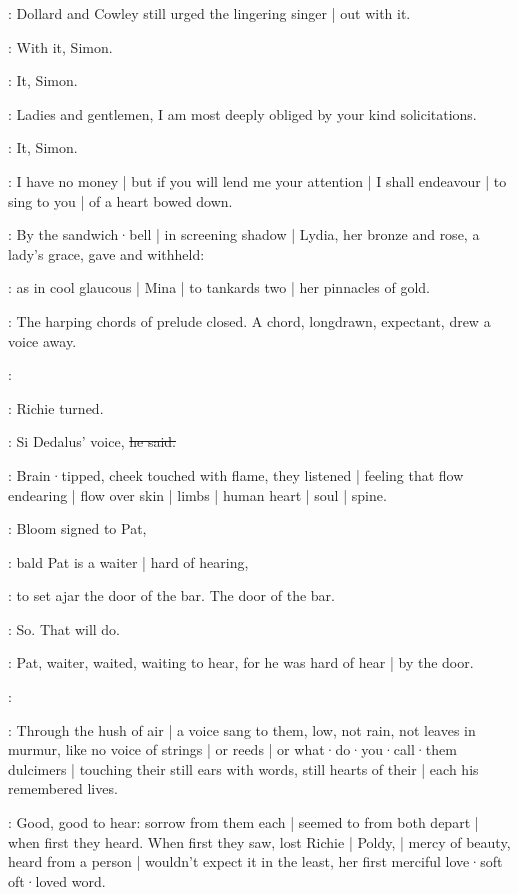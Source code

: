 :
Dollard and Cowley still urged the lingering singer |
out with it.

\dollard:
With it,
Simon.

\cowley:
It,
Simon.

\simon:
Ladies and gentlemen,
I am most deeply obliged by your kind
solicitations.

\cowley:
It,
Simon.

\simon:
I have no money |
but if you will lend me your attention |
I shall endeavour |
to sing to you |
of a heart bowed down.

:
By the sandwich·bell |
in screening shadow |
Lydia,
her bronze and rose,
a lady's grace,
gave and withheld:

:
as in cool glaucous  |
Mina |
to tankards two |
her pinnacles of gold.

:
The harping chords of prelude closed.
A chord,
longdrawn,
expectant,
drew a voice away.

\simon:

:
Richie turned.

\goulding:
Si Dedalus' voice,
\sout{he said.}

:
Brain·tipped,
cheek touched with flame,
they listened |
feeling that flow endearing |
flow over skin |
limbs |
human heart |
soul |
spine.

:
Bloom signed to Pat,

\BloomInt:
bald Pat is a waiter |
hard of hearing,

:
to set ajar the door of the bar.
The door of the bar.

\BloomInt:
So.
That will do.

:
Pat,
waiter,
waited,
waiting
to hear,
for he was hard of hear |
by the door.

\simon:

:
Through the hush of air |
a voice sang to them,
low,
not rain,
not leaves
in murmur,
like no voice of strings |
or reeds |
or what·do·you·call·them dulcimers |
touching their still ears with words,
still hearts of their |
each his remembered lives.

:
Good,
good to hear:
sorrow from them each |
seemed to from both depart |
when first they heard.
When first they saw,
lost Richie |
Poldy, |
mercy of beauty,
heard from a person |
wouldn't expect it in the least,
her first merciful
love·soft oft·loved word.

